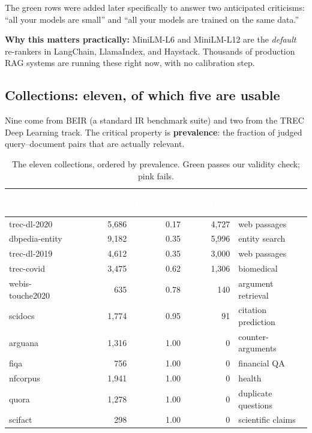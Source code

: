 \documentclass[11pt,a4paper]{article}
\newcommand{\thead}[1]{\textcolor{white}{\textbf{#1}}}
\begin{document}
The green rows were added later specifically to answer two anticipated criticisms:
``all your models are small'' and ``all your models are trained on the same data.''

\textbf{Why this matters practically:} MiniLM-L6 and MiniLM-L12 are the \emph{default}
re-rankers in LangChain, LlamaIndex, and Haystack. Thousands of production RAG
systems are running these right now, with no calibration step.

\subsection{Collections: eleven, of which five are usable}
Nine come from BEIR (a standard IR benchmark suite) and two from the TREC Deep
Learning track. The critical property is \textbf{prevalence}: the fraction of judged
query--document pairs that are actually relevant.

\begin{table}[h]
\centering
\caption{The eleven collections, ordered by prevalence. Green passes our validity
check; pink fails.}\label{tab:collections}
\small
\begin{tabular}{lrrrl}
\toprule
\rowcolor{headblue}
\thead{Collection} & \thead{Judged pairs} & \thead{Prevalence} & \thead{Negatives} & \thead{Domain} \\
\midrule
\rowcolor{cleangreen}
trec-dl-2020     & 5{,}686 & 0.17 & 4{,}727 & web passages \\
\rowcolor{cleangreen}
dbpedia-entity   & 9{,}182 & 0.35 & 5{,}996 & entity search \\
\rowcolor{cleangreen}
trec-dl-2019     & 4{,}612 & 0.35 & 3{,}000 & web passages \\
\rowcolor{cleangreen}
trec-covid       & 3{,}475 & 0.62 & 1{,}306 & biomedical \\
\rowcolor{cleangreen}
webis-touche2020 & 635     & 0.78 & 140     & argument retrieval \\
\rowcolor{singleclasspink}
scidocs          & 1{,}774 & 0.95 & 91      & citation prediction \\
\rowcolor{singleclasspink}
arguana          & 1{,}316 & 1.00 & 0       & counter-arguments \\
\rowcolor{singleclasspink}
fiqa             & 756     & 1.00 & 0       & financial QA \\
\rowcolor{singleclasspink}
nfcorpus         & 1{,}941 & 1.00 & 0       & health \\
\rowcolor{singleclasspink}
quora            & 1{,}278 & 1.00 & 0       & duplicate questions \\
\rowcolor{singleclasspink}
scifact          & 298     & 1.00 & 0       & scientific claims \\
\bottomrule
\end{tabular}
\end{table}
\end{document}
